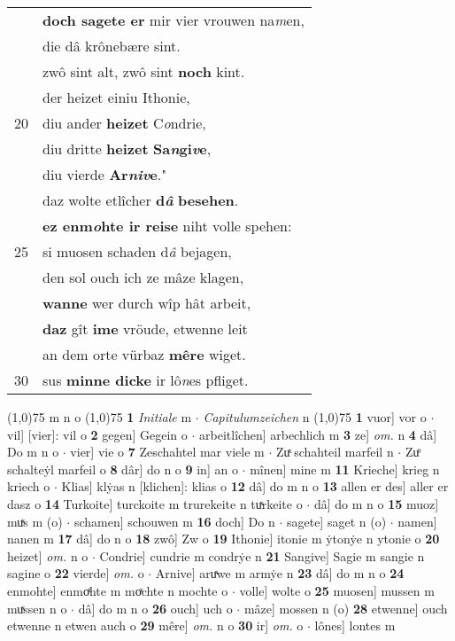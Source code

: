 \documentclass[8pt,a4paper,notitlepage]{article}
\begin{document}
\begin{table}[ht]
\begin{minipage}[t]{0.5\linewidth}
\begin{tabular}{rl}
 & \textbf{doch sagete er} mir vier vrouwen na\textit{m}en,\\ 
 & die dâ krônebære sint.\\ 
 & zwô sint alt, zwô sint \textbf{noch} kint.\\ 
 & der heizet einiu Ithonie,\\ 
20 & diu ander \textbf{heizet} C\textit{o}ndrie,\\ 
 & diu dritte \textbf{heizet} \textbf{Sa\textit{n}gi\textit{v}e},\\ 
 & diu vierde \textbf{Ar\textit{niv}e}."\\ 
 & daz wolte etlîcher \textbf{d\textit{â}} \textbf{besehen}.\\ 
 & \textbf{ez enm\textit{o}hte ir reise} niht volle spehen:\\ 
25 & si muosen schaden d\textit{â} bejagen,\\ 
 & den sol ouch ich ze mâze klagen,\\ 
 & \textbf{wanne} wer durch wîp hât arbeit,\\ 
 & \textbf{daz} gît \textbf{ime} vröude, etwenne leit\\ 
 & an dem orte vürbaz \textbf{mêre} wiget.\\ 
30 & sus \textbf{minne dicke} ir lô\textit{n}es pfliget.\\ 
\end{tabular}
\scriptsize
\line(1,0){75} \newline
m n o \newline
\line(1,0){75} \newline
\textbf{1} \textit{Initiale} m   $\cdot$ \textit{Capitulumzeichen} n  \newline
\line(1,0){75} \newline
\textbf{1} vuor] vor o  $\cdot$ vil] [vier]: vil o \textbf{2} gegen] Gegein o  $\cdot$ arbeitlîchen] arbechlich m \textbf{3} ze] \textit{om.} n \textbf{4} dâ] Do m n o  $\cdot$ vier] vie o \textbf{7} Zeschahtel mar viele m  $\cdot$ Zuͯ schahteil marfeil n  $\cdot$ Zuͦ schalteẏl marfeil o \textbf{8} dâr] do n o \textbf{9} in] an o  $\cdot$ mînen] mine m \textbf{11} Krieche] krieg n kriech o  $\cdot$ Klias] klẏas n [klichen]: klias o \textbf{12} dâ] do m n o \textbf{13} allen er des] aller er dasz o \textbf{14} Turkoite] turckoite m trurekeite n tuͯrkeite o  $\cdot$ dâ] do m n o \textbf{15} muoz] muͯs m (o)  $\cdot$ schamen] schouwen m \textbf{16} doch] Do n  $\cdot$ sagete] saget n (o)  $\cdot$ namen] nanen m \textbf{17} dâ] do n o \textbf{18} zwô] Zw o \textbf{19} Ithonie] itonie m ẏtonẏe n ytonie o \textbf{20} heizet] \textit{om.} n o  $\cdot$ Condrie] cundrie m condrẏe n \textbf{21} Sangive] Sagie m sangie n sagine o \textbf{22} vierde] \textit{om.} o  $\cdot$ Arnive] aruͯwe m armẏe n \textbf{23} dâ] do m n o \textbf{24} enmohte] enmoͯhte m moͯchte n mochte o  $\cdot$ volle] wolte o \textbf{25} muosen] mussen m muͯssen n o  $\cdot$ dâ] do m n o \textbf{26} ouch] uch o  $\cdot$ mâze] mossen n (o) \textbf{28} etwenne] ouch etwenne n etwen auch o \textbf{29} mêre] \textit{om.} n o \textbf{30} ir] \textit{om.} o  $\cdot$ lônes] lontes m \newline
\end{minipage}
\end{table}
\end{document}
